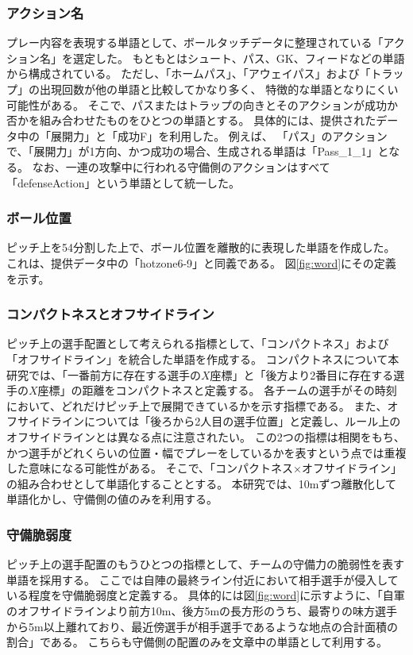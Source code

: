 \subsubsection{アクション名}
プレー内容を表現する単語として、ボールタッチデータに整理されている「アクション名」を選定した。
もともとはシュート、パス、GK、フィードなどの単語から構成されている。
ただし、「ホームパス」、「アウェイパス」および「トラップ」の出現回数が他の単語と比較してかなり多く、 特徴的な単語となりにくい可能性がある。
そこで、パスまたはトラップの向きとそのアクションが成功か否かを組み合わせたものをひとつの単語とする。
具体的には、提供されたデータ中の「展開力」と「成功F」を利用した。
例えば、
「パス」のアクションで、「展開力」が1方向、かつ成功の場合、生成される単語は「Pass\_1\_1」となる。
なお、一連の攻撃中に行われる守備側のアクションはすべて「defenseAction」という単語として統一した。


\subsubsection{ボール位置}
ピッチ上を54分割した上で、ボール位置を離散的に表現した単語を作成した。
これは、提供データ中の「hotzone6-9」と同義である。
図\ref{fig:word}にその定義を示す。


\subsubsection{コンパクトネスとオフサイドライン}
ピッチ上の選手配置として考えられる指標として、「コンパクトネス」および「オフサイドライン」を統合した単語を作成する。
コンパクトネスについて本研究では、「一番前方に存在する選手の$X$座標」と「後方より2番目に存在する選手の$X$座標」の距離をコンパクトネスと定義する。
各チームの選手がその時刻において、どれだけピッチ上で展開できているかを示す指標である。
また、オフサイドラインについては「後ろから2人目の選手位置」と定義し、ルール上のオフサイドラインとは異なる点に注意されたい。
この2つの指標は相関をもち、かつ選手がどれくらいの位置・幅でプレーをしているかを表すという点では重複した意味になる可能性がある。
そこで、「コンパクトネス×オフサイドライン」の組み合わせとして単語化することとする。
本研究では、10mずつ離散化して単語化かし、守備側の値のみを利用する。 

\subsubsection{守備脆弱度}
ピッチ上の選手配置のもうひとつの指標として、チームの守備力の脆弱性を表す単語を採用する。
ここでは自陣の最終ライン付近において相手選手が侵入している程度を守備脆弱度と定義する。
具体的には図\ref{fig:word}に示すように、「自軍のオフサイドラインより前方10m、後方5mの長方形のうち、最寄りの味方選手から5m以上離れており、最近傍選手が相手選手であるような地点の合計面積の割合」である。
こちらも守備側の配置のみを文章中の単語として利用する。

